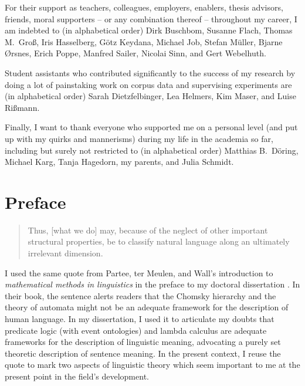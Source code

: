 \documentclass[a4paper, biblatex, charis, linguex]{glossa}
\begin{document}
For their support as teachers, colleagues, employers, enablers, thesis advisors, friends, moral supporters -- or any combination thereof -- throughout my career, I am indebted to (in alphabetical order) Dirk Buschbom, Susanne Flach, Thomas M.\ Groß, Iris Hasselberg, Götz Keydana, Michael Job, Stefan Müller, Bjarne Ørsnes, Erich Poppe, Manfred Sailer, Nicolai Sinn, and Gert Webelhuth.

Student assistants who contributed significantly to the success of my research by doing a lot of painstaking work on corpus data and supervising experiments are (in alphabetical order) Sarah Dietzfelbinger, Lea Helmers, Kim Maser, and Luise Rißmann.

Finally, I want to thank everyone who supported me on a personal level (and put up with my quirks and mannerisms) during my life in the academia so far, including but surely not restricted to (in alphabetical order) Matthias B.\ Döring, Michael Karg, Tanja Hagedorn, my parents, and Julia Schmidt.

\newpage

\section*{Preface}

\begin{quote}
  Thus, [what we do] may, because of the neglect of other important structural properties, be to classify natural language along an ultimately irrelevant dimension. \citep[436--437]{ParteeEa1990}
\end{quote}

I used the same quote from Partee, ter Meulen, and Wall's introduction to \textit{mathematical methods in linguistics} in the preface to my doctoral dissertation \citep{Schaefer2010}.
In their book, the sentence alerts readers that the Chomsky hierarchy and the theory of automata might not be an adequate framework for the description of human language.
In my dissertation, I used it to articulate my doubts that predicate logic (with event ontologies) and lambda calculus are adequate frameworks for the description of linguistic meaning, advocating a purely set theoretic description of sentence meaning.
In the present context, I reuse the quote to mark two aspects of linguistic theory which seem important to me at the present point in the field's development.
\end{document}
